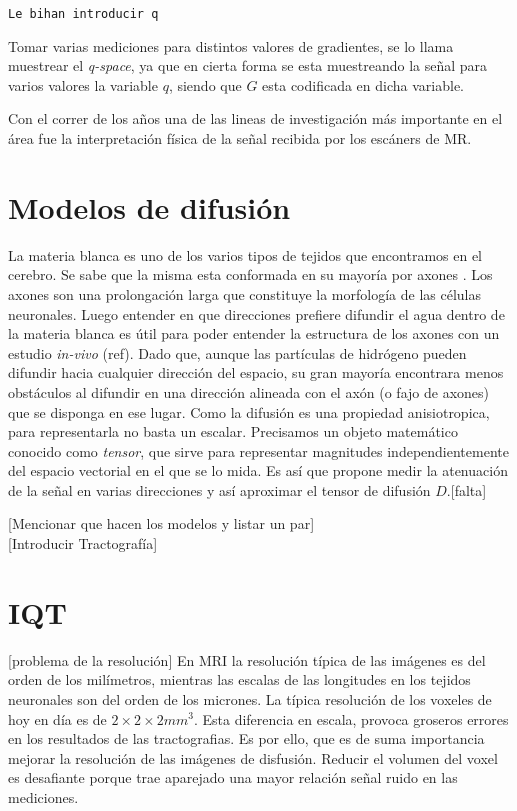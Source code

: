\documentclass[11pt,a4paper,twoside]{tesis}
\begin{document}
\begin{verbatim}
Le bihan introducir q
\end{verbatim}




Tomar varias mediciones para distintos valores de gradientes, se lo llama 
muestrear el \textit{q-space}, ya que en cierta forma se esta 
muestreando la señal para varios valores la variable $q$, siendo que $G$ esta codificada en dicha 
variable.


Con el correr de los años una de las lineas de investigación más 
importante en el \'area fue la interpretaci\'on f\'isica de la se\~nal recibida 
por los escáners de MR.  



\section{Modelos de difusi\'on}
La materia blanca es uno de los varios tipos de tejidos que encontramos en el cerebro. Se sabe que 
la misma esta conformada en su mayor\'ia por axones \citep{Purves2004}. Los axones son una 
prolongaci\'on larga que constituye la morfolog\'ia de las c\'elulas neuronales. 
Luego entender en que direcciones prefiere difundir el agua dentro de la materia 
blanca es \'util para poder entender la estructura de los 
axones con un estudio \textit{in-vivo} (ref). Dado que, aunque las part\'iculas 
de hidr\'ogeno pueden difundir hacia cualquier direcci\'on del espacio, su gran mayor\'ia 
encontrara 
menos obst\'aculos al difundir en una direcci\'on alineada con el ax\'on (o fajo de axones) que se 
disponga en ese lugar. 
Como la difusi\'on es una propiedad anisiotropica, para representarla no basta un escalar. Precisamos un objeto 
matem\'atico conocido como \textit{tensor}, que sirve para representar magnitudes independientemente del espacio
vectorial en el que se lo mida. Es as\'i que \citet{Basser1994} propone medir la 
atenuaci\'on de la se\~nal en varias direcciones y as\'i aproximar el tensor de difusi\'on 
$D$.[falta]
  
[Mencionar que hacen los modelos y listar un par]\\%


[Introducir Tractograf\'ia]



\section{IQT}
[problema de la resoluci\'on]
En MRI la resoluci\'on t\'ipica de las im\'agenes es del orden de los mil\'imetros, mientras las 
escalas de las longitudes en los tejidos neuronales son del orden de los micrones. La t\'ipica 
resoluci\'on de los voxeles de hoy en d\'ia es de $2\times2\times2 mm^3$. Esta diferencia en 
escala, provoca groseros errores en los resultados de las tractografias. Es por ello, que es de 
suma importancia mejorar la resoluci\'on de las im\'agenes de disfusi\'on. Reducir el volumen del 
voxel es desafiante porque trae aparejado una mayor relaci\'on se\~nal ruido en las mediciones. 
\end{document}
